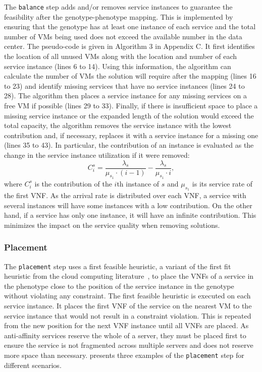 The \texttt{balance} step adds and/or removes service instances to guarantee the feasibility after the genotype-phenotype mapping. This is implemented by ensuring that the genotype has at least one instance of each service and the total number of VMs being used does not exceed the available number in the data center. The pseudo-code is given in Algorithm 3 in Appendix C. It first identifies the location of all unused VMs along with the location and number of each service instance (lines 6 to 14). Using this information, the algorithm can calculate the number of VMs the solution will require after the mapping (lines 16 to 23) and identify missing services that have no service instances (lines 24 to 28). The algorithm then places a service instance for any missing services on a free VM if possible (lines 29 to 33). Finally, if there is insufficient space to place a missing service instance or the expanded length of the solution would exceed the total capacity, the algorithm removes the service instance with the lowest contribution and, if necessary, replaces it with a service instance for a missing one (lines 35 to 43). In particular, the contribution of an instance is evaluated as the change in the service instance utilization if it were removed:
\begin{equation}
	C^s_i = \frac{\lambda_{s}}{\mu_{s_1} \cdot (i - 1)} - \frac{\lambda_{s}}{\mu_{s_1} \cdot i},
	\label{eq:contribution}
\end{equation}
\noindent where $C^s_i$ is the contribution of the $i$th instance of $s$ and $\mu_{s_1}$ is its service rate of the first VNF. As the arrival rate is distributed over each VNF, a service with several instances will have some instances with a low contribution. On the other hand, if a service has only one instance, it will have an infinite contribution. This minimizes the impact on the service quality when removing solutions. 

\subsubsection{Placement}

The \texttt{placement} step uses a first feasible heuristic, a variant of the first fit heuristic from the cloud computing literature~\cite{KellerTLB12}, to place the VNFs of a service in the phenotype close to the position of the service instance in the genotype without violating any constraint. The first feasible heuristic is executed on each service instance. It places the first VNF of the service on the nearest VM to the service instance that would not result in a constraint violation. This is repeated from the new position for the next VNF instance until all VNFs are placed. As anti-affinity services reserve the whole of a server, they must be placed first to ensure the service is not fragmented across multiple servers and does not reserve more space than necessary.  presents three examples of the \texttt{placement} step for different scenarios.


